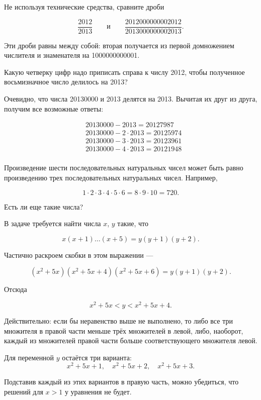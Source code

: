 \begin{itemize}

\itA Не используя технические средства, сравните дроби

$$
\frac{2012}{2013}\qquad\text{и}\qquad\frac{2012000000002012}{2013000000002013}.
$$

\itr Эти дроби равны между собой: вторая получается из первой домножением числителя и знаменателя на 1000000000001.

\bigbreak\noindent

\end{itemize}


\begin{itemize}

\itA Какую четверку цифр надо приписать справа к числу 2012, чтобы полученное восьмизначное число делилось на 2013?

\itr Очевидно, что числа 20130000 и 2013 делятся на 2013. Вычитая их друг из друга, получим все возможные ответы:

\begin{align*}
	& 20130000 - 2013 = 20127987 \\
	& 20130000 - 2 \cdot 2013 = 20125974 \\
	& 20130000 - 3 \cdot 2013 = 20123961 \\
	& 20130000 - 4 \cdot 2013 = 20121948 \\
\end{align*}

\itC Произведение шести последовательных натуральных чисел может быть равно произведению трех последовательных натуральных чисел. Например,

$$1\cdot 2\cdot 3\cdot 4\cdot 5\cdot 6=8\cdot 9\cdot 10=720.$$

Есть ли еще такие числа?

\itr В задаче требуется найти числа $x$, $y$ такие, что

\vspace{-0.4cm}
$$x(x+1)\ldots(x+5) = y(y+1)(y+2).$$

Частично раскроем скобки в этом выражении — 

\vspace{-0.4cm}
$$(x^2 + 5x)(x^2 + 5x + 4)(x^2 + 5x + 6) = y(y + 1)(y + 2).$$

Отсюда

\vspace{-0.4cm}
$$x^2+5x<y<x^2+5x+4.$$

Действительно: если бы неравенство выше не выполнено, то либо все три множителя в правой части меньше трёх множителей в левой, либо, наоборот, каждый из множителей правой части больше соответствующего множителя левой.

Для переменной $y$ остаётся три варианта:
	$$x^2+5x+1,\quad x^2+5x+2,\quad x^2+5x+3.$$

Подставив каждый из этих вариантов в правую часть, можно убедиться, что решений для $x>1$ у уравнения не будет.

\end{itemize}

